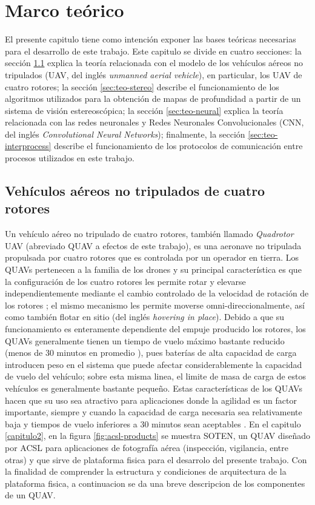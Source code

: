\chapter{Marco teórico}
\label{capitulo3}

El presente capitulo tiene como intención exponer las bases teóricas necesarias para el desarrollo de este trabajo. Este capitulo se divide en cuatro secciones: la sección \ref{sec:teo-uav} explica la teoría relacionada con el modelo de los vehículos aéreos no tripulados (UAV, del inglés \textit{unmanned aerial vehicle}), en particular, los UAV de cuatro rotores; la sección \ref{sec:teo-stereo} describe el funcionamiento de los algoritmos utilizados para la obtención de mapas de profundidad a partir de un sistema de visión estereoscópica; la sección \ref{sec:teo-neural} explica la teoría relacionada con las redes neuronales y Redes Neuronales Convolucionales (CNN, del inglés \textit{Convolutional Neural Networks}); finalmente, la sección \ref{sec:teo-interprocess} describe el funcionamiento de los protocolos de comunicación entre procesos utilizados en este trabajo.

\section{Vehículos aéreos no tripulados de cuatro rotores}
\label{sec:teo-uav}

Un vehículo aéreo no tripulado de cuatro rotores, también llamado \textit{Quadrotor} UAV (abreviado QUAV a efectos de este trabajo), es una aeronave no tripulada propulsada por cuatro rotores que es controlada por un operador en tierra. Los QUAVs pertenecen a la familia de los drones y su principal característica es que la configuración de los cuatro rotores les permite rotar y elevarse independientemente mediante el cambio controlado de la velocidad de rotación de los rotores \cite{multidrone2017review}; el mismo mecanismo les permite moverse omni-direccionalmente, así como también flotar en sitio (del inglés \textit{hovering in place}). Debido a que su funcionamiento es enteramente dependiente del empuje producido los rotores, los QUAVs generalmente tienen un tiempo de vuelo máximo bastante reducido (menos de 30 minutos en promedio \cite{multidrone2017review}), pues baterías de alta capacidad de carga introducen peso en el sistema que puede afectar considerablemente la capacidad de vuelo del vehículo; sobre esta misma linea, el limite de masa de carga de estos vehículos es generalmente bastante pequeño. Estas características de los QUAVs hacen que su uso sea atractivo para aplicaciones donde la agilidad es un factor importante, siempre y cuando la capacidad de carga necesaria sea relativamente baja y tiempos de vuelo inferiores a 30 minutos sean aceptables \cite{multidrone2017review}. En el capitulo \ref{capitulo2}, en la figura \ref{fig:acsl-products} se muestra SOTEN, un QUAV diseñado por ACSL para aplicaciones de fotografía aérea (inspección, vigilancia, entre otras) y que sirve de plataforma fisica para el desarrolo del presente trabajo. Con la finalidad de comprender la estructura y condiciones de arquitectura de la plataforma fisica, a continuacion se da una breve descripcion de los componentes de un QUAV. 

